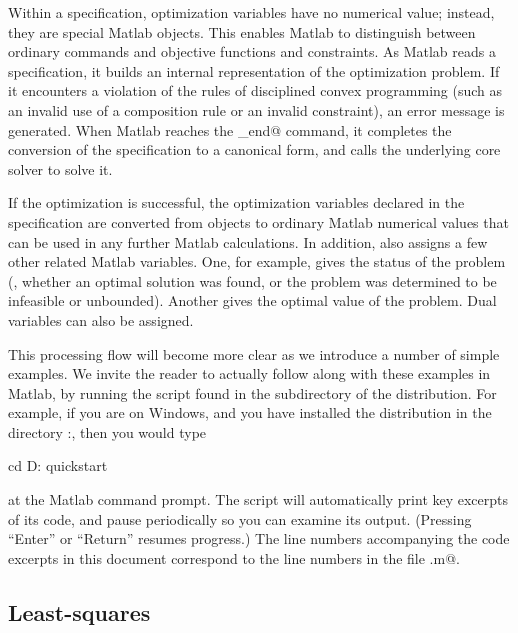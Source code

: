 \documentclass[12pt]{article}
\begin{document}
Within a \cvx specification, optimization variables have no numerical
value; instead, they are special Matlab objects.   
This enables Matlab to distinguish
between ordinary commands and \cvx objective
functions and constraints. As Matlab reads a \cvx specification,
it builds an internal representation of the
optimization problem. If it encounters a
violation of the rules of disciplined convex programming
(such as an invalid use of a composition rule or an invalid
constraint), an error message is generated.
When Matlab reaches 
the \verb@cvx_end@ command, it completes the conversion of
the \cvx specification to a canonical form,
and calls the underlying core solver to solve it.

If the optimization is successful,
the optimization variables declared in the \cvx specification
are converted from objects to ordinary Matlab numerical values
that can be used in any further Matlab calculations. In addition,
\cvx also assigns a few other related Matlab variables.
One, for example, gives the status of the problem (\ie, whether an
optimal solution was found, or the problem was determined to be 
infeasible or unbounded).  Another gives the optimal value
of the problem. Dual variables can also be assigned.

This processing flow will become more clear as we introduce
a number of simple examples. We invite the reader to actually follow
along with these examples in Matlab, by running the \verb@quickstart@
script found in the \verb@examples@ subdirectory of the \cvx distribution. 
For example,
if you are on Windows, and you have installed the \cvx distribution
in the directory \verb@D:\Matlab\cvx@, then you would type
\begin{code}
	cd D:\Matlab\cvx\examples
	quickstart
\end{code}
at the Matlab command prompt.
The script will automatically print key excerpts of its code, and
pause periodically so you can examine its output. (Pressing ``Enter''
or ``Return'' resumes progress.) 
The line numbers accompanying the code excerpts in this
document correspond to the line numbers in the file \verb@quickstart.m@.

\subsection{Least-squares}
\label{sec:leastsquares}
\end{document}
